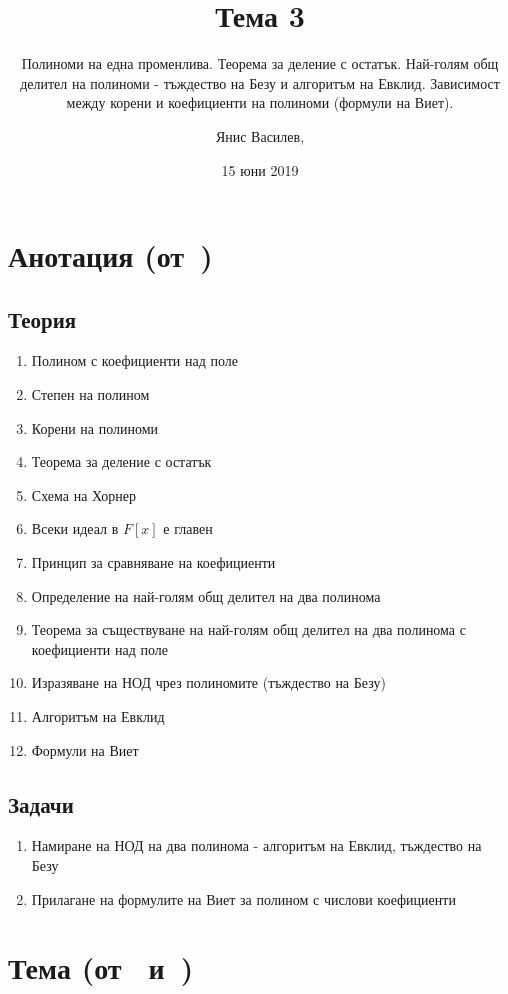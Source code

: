 \documentclass[numbers=endperiod, DIV=15]{scrartcl}
\title{Тема 3}
\subtitle{Полиноми на една променлива. Теорема за деление с остатък. Най-голям общ делител на полиноми - тъждество на Безу и алгоритъм на Евклид. Зависимост между корени и коефициенти на полиноми (формули на Виет).}
\author{Янис Василев, \Email{ianis@ivasilev.net}}
\date{15 юни 2019}
\begin{document}
\maketitle

\section{Анотация (от~\cite{Syllabus})}

\subsection{Теория}

\begin{enumerate}
  \item Полином с коефициенти над поле
  \item Степен на полином
  \item Корени на полиноми
  \item Теорема за деление с остатък
  \item Схема на Хорнер
  \item Всеки идеал в $F[x]$ е главен
  \item Принцип за сравняване на коефициенти
  \item Определение на най-голям общ делител на два полинома
  \item Теорема за съществуване на най-голям общ делител на два полинома с коефициенти над поле
  \item Изразяване на НОД чрез полиномите (тъждество на Безу)
  \item Алгоритъм на Евклид
  \item Формули на Виет
\end{enumerate}

\subsection{Задачи}

\begin{enumerate}
  \item Намиране на НОД на два полинома - алгоритъм на Евклид, тъждество на Безу
  \item Прилагане на формулите на Виет за полином с числови коефициенти
\end{enumerate}

\section{Тема (от~\cite{Notes} и~\cite{Knapp})}
\end{document}
